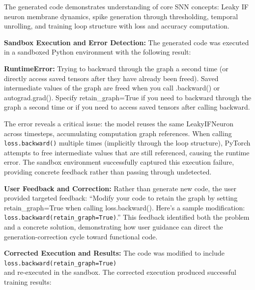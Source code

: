 The generated code demonstrates understanding of core SNN concepts: Leaky IF neuron membrane dynamics, spike generation through thresholding, temporal unrolling, and training loop structure with loss and accuracy computation.

\vspace{0.3cm}

\noindent \textbf{Sandbox Execution and Error Detection:} The generated code was executed in a sandboxed Python environment with the following result:

\begin{center}
  \textbf{RuntimeError:} Trying to backward through the graph a second time (or directly access saved tensors after they have already been freed). Saved intermediate values of the graph are freed when you call .backward() or autograd.grad(). Specify retain\_graph=True if you need to backward through the graph a second time or if you need to access saved tensors after calling backward.
\end{center}

The error reveals a critical issue: the model reuses the same LeakyIFNeuron across timesteps, accumulating computation graph references. When calling \texttt{loss.backward()} multiple times (implicitly through the loop structure), PyTorch attempts to free intermediate values that are still referenced, causing the runtime error. The sandbox environment successfully captured this execution failure, providing concrete feedback rather than passing through undetected.

\vspace{0.3cm}

\noindent \textbf{User Feedback and Correction:} Rather than generate new code, the user provided targeted feedback: ``Modify your code to retain the graph by setting retain\_graph=True when calling loss.backward(). Here's a sample modification: \texttt{loss.backward(retain\_graph=True)}.'' This feedback identified both the problem and a concrete solution, demonstrating how user guidance can direct the generation-correction cycle toward functional code.

\vspace{0.3cm}

\noindent \textbf{Corrected Execution and Results:} The code was modified to include \\
\texttt{loss.backward(retain\_graph=True)} \\
and re-executed in the sandbox.
The corrected execution produced successful training results:


